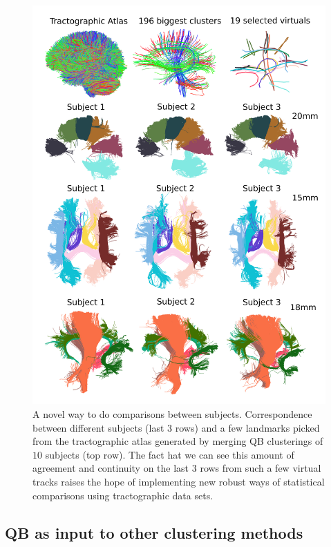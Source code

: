 \documentclass[preprint,authoryear,a4paper,10pt,onecolumn]{elsarticle}
\begin{document}
%
\begin{figure}
\begin{centering}
\includegraphics[scale=0.7]{last_figures/close_distance}
\par\end{centering}
\caption{A novel way to do comparisons between subjects. Correspondence
  between different subjects (last $3$ rows) and a few landmarks picked
  from the tractographic atlas generated by merging QB clusterings of
  $10$ subjects (top row). The fact hat we can see this amount of
  agreement and continuity on the last $3$ rows from such a few virtual
  tracks raises the hope of implementing new robust ways of statistical
  comparisons using tractographic data sets.\label{Flo:CloseToSelected}}
\end{figure}

\subsection{QB as input to other clustering methods}
\end{document}
